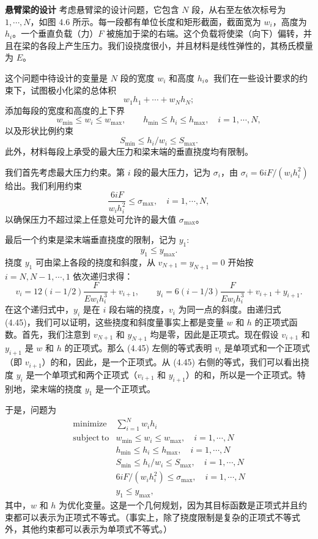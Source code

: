 \documentclass[UTF8,12pt,a4paper,fontset=fandol]{ctexart}
\begin{document}
\noindent\textbf{悬臂梁的设计}\quad
考虑悬臂梁的设计问题，它包含 $N$ 段，从右至左依次标号为 $1,\cdots,N$，如图 4.6 所示。每一段都有单位长度和矩形截面，截面宽为 $w_i$，高度为 $h_i$。一个垂直负载（力）$F$ 被施加于梁的右端。这个负载将使梁（向下）偏转，并且在梁的各段上产生压力。我们设挠度很小，并且材料是线性弹性的，其杨氏模量为 $E$。

这个问题中待设计的变量是 $N$ 段的宽度 $w_i$ 和高度 $h_i$。我们在一些设计要求的约束下，试图极小化梁的总体积
\[
w_1h_1+\cdots+w_Nh_N;
\]
添加每段的宽度和高度的上下界
\[
w_{\min}\leq w_i\leq w_{\max},\qquad
h_{\min}\leq h_i\leq h_{\max},\quad i=1,\cdots,N,
\]
以及形状比例约束
\[
S_{\min}\leq h_i/w_i\leq S_{\max}.
\]
此外，材料每段上承受的最大压力和梁末端的垂直挠度均有限制。

我们首先考虑最大压力约束。第 $i$ 段的最大压力，记为 $\sigma_i$，由 $\sigma_i=6iF/(w_ih_i^2)$ 给出。我们利用约束
\[
\frac{6iF}{w_ih_i^2}\leq \sigma_{\max},\quad i=1,\cdots,N,
\]
以确保压力不超过梁上任意处可允许的最大值 $\sigma_{\max}$。

最后一个约束是梁末端垂直挠度的限制，记为 $y_1$:
\[
y_1\leq y_{\max}.
\]
挠度 $y_1$ 可由梁上各段的挠度和斜度，从 $v_{N+1}=y_{N+1}=0$ 开始按 $i=N,N-1,\cdots,1$ 依次递归求得：
\begin{equation}
v_i=12(i-1/2)\frac{F}{Ew_ih_i^3}+v_{i+1},\qquad
y_i=6(i-1/3)\frac{F}{Ew_ih_i^3}+v_{i+1}+y_{i+1}.
\tag{4.45}
\end{equation}
在这个递归式中，$y_i$ 是在 $i$ 段右端的挠度，$v_i$ 为同一点的斜度。由递归式 (4.45)，我们可以证明，这些挠度和斜度量事实上都是变量 $w$ 和 $h$ 的正项式函数。首先，我们注意到 $v_{N+1}$ 和 $y_{N+1}$ 均是零，因此是正项式。现在假设 $v_{i+1}$ 和 $y_{i+1}$ 是 $w$ 和 $h$ 的正项式。那么 (4.45) 左侧的等式表明 $v_i$ 是单项式和一个正项式（即 $v_{i+1}$）的和，因此，是一个正项式。从 (4.45) 右侧的等式，我们可以看出挠度 $y_i$ 是一个单项式和两个正项式（$v_{i+1}$ 和 $y_{i+1}$）的和，所以是一个正项式。特别地，梁末端的挠度 $y_1$ 是一个正项式。

于是，问题为
\begin{equation}
\begin{array}{ll}
\mathop{\mathrm{minimize}} & \displaystyle\sum_{i=1}^N w_ih_i\\
\mathrm{subject\ to} & w_{\min}\leq w_i\leq w_{\max},\quad i=1,\cdots,N\\
& h_{\min}\leq h_i\leq h_{\max},\quad i=1,\cdots,N\\
& S_{\min}\leq h_i/w_i\leq S_{\max},\quad i=1,\cdots,N\\
& 6iF/(w_ih_i^2)\leq \sigma_{\max},\quad i=1,\cdots,N\\
& y_1\leq y_{\max},
\end{array}
\tag{4.46}
\end{equation}
其中，$w$ 和 $h$ 为优化变量。这是一个几何规划，因为其目标函数是正项式并且约束都可以表示为正项式不等式。（事实上，除了挠度限制是复杂的正项式不等式外，其他约束都可以表示为单项式不等式。）
\end{document}
